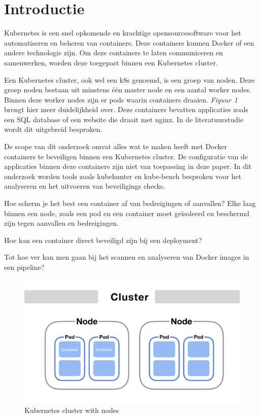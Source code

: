 
\section{Introductie}%
\label{sec:introductie}

Kubernetes is een snel opkomende en krachtige opensourcesoftware voor het automatiseren en beheren van containers. Deze containers kunnen Docker of een andere technologie zijn. Om deze containers te laten communiceren en samenwerken, worden deze toegepast binnen een Kubernetes cluster. 

Een Kubernetes cluster, ook wel een k8s genoemd, is een groep van noden. Deze groep noden bestaan uit minstens één master node en een aantal worker nodes. Binnen deze worker nodes zijn er pods waarin containers draaien. \textit{Figuur 1} brengt hier meer duidelijkheid over. Deze containers bevatten applicaties zoals een SQL database of een website die draait met nginx. In de literatuurstudie wordt dit uitgebreid besproken.

De scope van dit onderzoek omvat alles wat te maken heeft met Docker containers te beveiligen binnen een Kubernetes cluster. De configuratie van de applicaties binnen deze containers zijn niet van toepassing in deze paper. In dit onderzoek worden tools zoals kubehunter en kube-bench besproken voor het analyseren en het uitvoeren van beveiligings checks. 


Hoe scherm je het best een container af van bedreigingen of aanvallen? Elke laag binnen een node, zoals een pod en een container moet geïsoleerd en beschermd zijn tegen aanvallen en bedreigingen.

Hoe kan een container direct beveiligd zijn bij een deployment?

Tot hoe ver kan men gaan bij het scannen en analyseren van Docker images in een pipeline?

\begin{flushleft}
    \begin{figure}[h]
        \includegraphics[width=.49\textwidth]{img/node-overview.png}
        \caption{\label{fig:Kubernetes 4c}Kubernetes cluster with nodes \autocite{Kubernetes-MP}}
    \end{figure} 
\end{flushleft}

